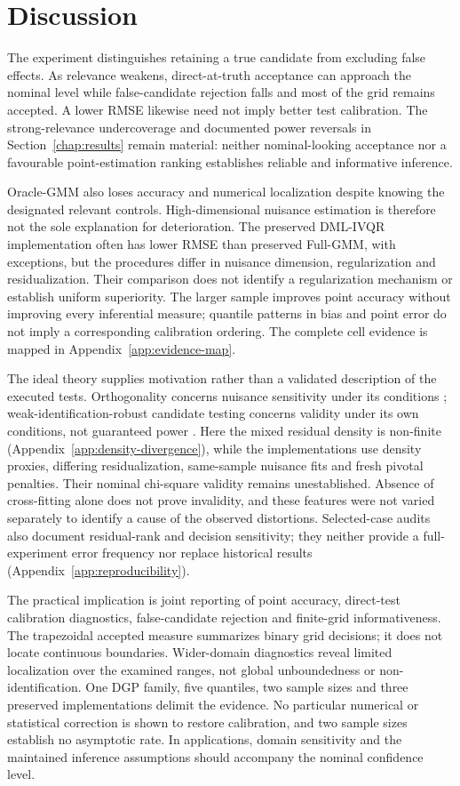 \section{Discussion}
\label{sec:results-overall-interpretation}

The experiment distinguishes retaining a true candidate from excluding false effects. As relevance weakens, direct-at-truth acceptance can approach the nominal level while false-candidate rejection falls and most of the grid remains accepted. A lower RMSE likewise need not imply better test calibration. The strong-relevance undercoverage and documented power reversals in Section~\ref{chap:results} remain material: neither nominal-looking acceptance nor a favourable point-estimation ranking establishes reliable and informative inference.

Oracle-GMM also loses accuracy and numerical localization despite knowing the designated relevant controls. High-dimensional nuisance estimation is therefore not the sole explanation for deterioration. The preserved DML-IVQR implementation often has lower RMSE than preserved Full-GMM, with exceptions, but the procedures differ in nuisance dimension, regularization and residualization. Their comparison does not identify a regularization mechanism or establish uniform superiority. The larger sample improves point accuracy without improving every inferential measure; quantile patterns in bias and point error do not imply a corresponding calibration ordering. The complete cell evidence is mapped in Appendix~\ref{app:evidence-map}.

The ideal theory supplies motivation rather than a validated description of the executed tests. Orthogonality concerns nuisance sensitivity under its conditions \parencite{chernozhukov_et_al_2018}; weak-identification-robust candidate testing concerns validity under its own conditions, not guaranteed power \parencite{chernozhukov_hansen_2008}. Here the mixed residual density is non-finite (Appendix~\ref{app:density-divergence}), while the implementations use density proxies, differing residualization, same-sample nuisance fits and fresh pivotal penalties. Their nominal chi-square validity remains unestablished. Absence of cross-fitting alone does not prove invalidity, and these features were not varied separately to identify a cause of the observed distortions. Selected-case audits also document residual-rank and decision sensitivity; they neither provide a full-experiment error frequency nor replace historical results (Appendix~\ref{app:reproducibility}).

The practical implication is joint reporting of point accuracy, direct-test calibration diagnostics, false-candidate rejection and finite-grid informativeness. The trapezoidal accepted measure summarizes binary grid decisions; it does not locate continuous boundaries. Wider-domain diagnostics reveal limited localization over the examined ranges, not global unboundedness or non-identification. One DGP family, five quantiles, two sample sizes and three preserved implementations delimit the evidence. No particular numerical or statistical correction is shown to restore calibration, and two sample sizes establish no asymptotic rate. In applications, domain sensitivity and the maintained inference assumptions should accompany the nominal confidence level.
